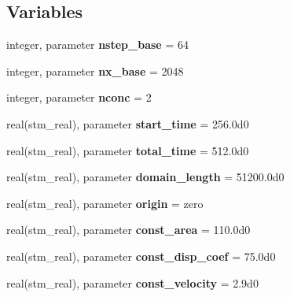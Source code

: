 \subsection*{Variables}
\begin{CompactItemize}
\item 
\hypertarget{a00074_9100073c8522df10842e2d681da2236a}{
integer, parameter \textbf{nstep\_\-base} = 64}
\label{a00074_9100073c8522df10842e2d681da2236a}

\item 
\hypertarget{a00074_cf4ff108869ce9ec16530942cd18c7b5}{
integer, parameter \textbf{nx\_\-base} = 2048}
\label{a00074_cf4ff108869ce9ec16530942cd18c7b5}

\item 
\hypertarget{a00074_81adb88f955edfec78791aeec57643e6}{
integer, parameter \textbf{nconc} = 2}
\label{a00074_81adb88f955edfec78791aeec57643e6}

\item 
\hypertarget{a00074_8307689ec6dbe847877f8b491ab6e374}{
real(stm\_\-real), parameter \textbf{start\_\-time} = 256.0d0}
\label{a00074_8307689ec6dbe847877f8b491ab6e374}

\item 
\hypertarget{a00074_c2d8064f26f34b1dcd8c579fc99b3dcf}{
real(stm\_\-real), parameter \textbf{total\_\-time} = 512.0d0}
\label{a00074_c2d8064f26f34b1dcd8c579fc99b3dcf}

\item 
\hypertarget{a00074_8f0ef8e29917e25d4ef1d518c08c4a78}{
real(stm\_\-real), parameter \textbf{domain\_\-length} = 51200.0d0}
\label{a00074_8f0ef8e29917e25d4ef1d518c08c4a78}

\item 
\hypertarget{a00074_bafcc589374e0eafe3dd0ec3117650f0}{
real(stm\_\-real), parameter \textbf{origin} = zero}
\label{a00074_bafcc589374e0eafe3dd0ec3117650f0}

\item 
\hypertarget{a00074_0be8e7a4794ab4811a54f6ae5b5ad575}{
real(stm\_\-real), parameter \textbf{const\_\-area} = 110.0d0}
\label{a00074_0be8e7a4794ab4811a54f6ae5b5ad575}

\item 
\hypertarget{a00074_4d071dcee893fb235e81f6013a3d080a}{
real(stm\_\-real), parameter \textbf{const\_\-disp\_\-coef} = 75.0d0}
\label{a00074_4d071dcee893fb235e81f6013a3d080a}

\item 
\hypertarget{a00074_99a61a0022f20e4f1fe2602ae3e0b39e}{
real(stm\_\-real), parameter \textbf{const\_\-velocity} = 2.9d0}
\label{a00074_99a61a0022f20e4f1fe2602ae3e0b39e}


\end{CompactItemize}
